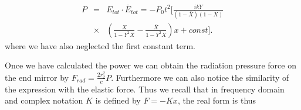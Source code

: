 %
%

\begin{align}
P&=&E_{tot}\cdot \overline{E}_{tot}=-P_0t^2 [ \frac{ikY}{(1-\overline{X})(1-X)}\nonumber\\ 
&\times &\left( \frac{X}{1-Y^2 X}-\frac{\overline{X}}{1-Y^2\overline{X}} \right) x + const].
\end{align}
where we have also neglected the first constant term.

Once we have calculated the power we can obtain the radiation pressure force on the end mirror by $F_{rad}=\frac{2 r_2^2}{c}P$. Furthermore
we can also notice the similarity of the expression with the elastic force. Thus we recall that
in frequency domain and complex notation $K$ is defined by $F=-Kx$, the real form is thus

